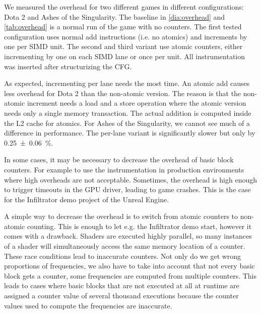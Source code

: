 We measured the overhead for two different games in different configurations: Dota 2 and Ashes of the Singularity. The baseline in \cref{dia:overhead} and \cref{tab:overhead} is a normal run of the game with no counters.
The first tested configuration uses normal add instructions (i.e. no atomics) and increments by one per SIMD unit.
The second and third variant use atomic counters, either incrementing by one on each SIMD lane or once per unit.
All instrumentation was inserted after structurizing the CFG.

As expected, incrementing per lane needs the most time. An atomic add causes less overhead for Dota 2 than the non-atomic version.
The reason is that the non-atomic increment needs a load and a store operation where the atomic version needs only a single memory transaction. The actual addition is computed inside the L2 cache for atomics.
For Ashes of the Singularity, we cannot see much of a difference in performance. The per-lane variant is significantly slower but only by \SI{0.25 \pm 0.06}{\percent}.




\begin{table}
\centering
{}
\label{tab:overhead}
\end{table}


In some cases, it may be necessary to decrease the overhead of basic block counters. For example to use the instrumentation in production environments where high overheads are not acceptable.
Sometimes, the overhead is high enough to trigger timeouts in the GPU driver, leading to game crashes. This is the case for the Infiltrator demo project of the Unreal Engine.

A simple way to decrease the overhead is to switch from atomic counters to non-atomic counting. This is enough to let e.g. the Infiltrator demo start, however it comes with a drawback. Shaders are executed highly parallel, so many instances of a shader will simultaneously access the same memory location of a counter.
These race conditions lead to inaccurate counters. Not only do we get wrong proportions of frequencies, we also have to take into account that not every basic block gets a counter, some frequencies are computed from multiple counters. This leads to cases where basic blocks that are not executed at all at runtime are assigned a counter value of several thousand executions because the counter values used to compute the frequencies are inaccurate.

